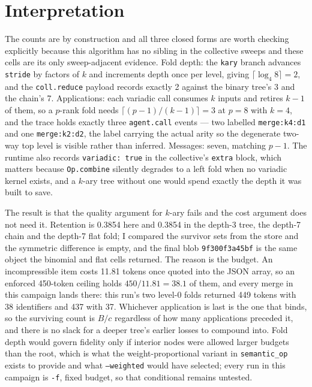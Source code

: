 \documentclass[11pt]{article}
\begin{document}
\section{Interpretation}

The counts are by construction and all three closed forms are worth checking explicitly
because this algorithm has no sibling in the collective sweeps and these cells are its only
sweep-adjacent evidence. Fold depth: the \texttt{kary} branch advances
\texttt{stride} by factors of $k$ and increments depth once per level, giving
$\lceil\log_4 8\rceil = 2$, and the \texttt{coll.reduce} payload records exactly 2 against
the binary tree's 3 and the chain's 7. Applications: each variadic call consumes $k$ inputs
and retires $k-1$ of them, so a $p$-rank fold needs $\lceil (p-1)/(k-1)\rceil = 3$ at $p=8$
with $k=4$, and the trace holds exactly three \texttt{agent.call} events --- two labelled
\texttt{merge:k4:d1} and one \texttt{merge:k2:d2}, the label carrying the actual arity so
the degenerate two-way top level is visible rather than inferred. Messages: seven, matching
$p-1$. The runtime also records \texttt{variadic: true} in the collective's \texttt{extra}
block, which matters because \texttt{Op.combine} silently degrades to a left fold when no
variadic kernel exists, and a $k$-ary tree without one would spend exactly the depth it was
built to save.

The result is that the quality argument for $k$-ary fails and the cost argument does not
need it. Retention is 0.3854 here and 0.3854 in the depth-3 tree, the depth-7 chain and the
depth-7 flat fold; I compared the survivor sets from the store and the symmetric difference
is empty, and the final blob \texttt{9f300f3a45bf} is the same object the binomial and flat
cells returned. The reason is the budget. An incompressible item costs 11.81 tokens once
quoted into the JSON array, so an enforced 450-token ceiling holds $450/11.81 = 38.1$ of
them, and every merge in this campaign lands there: this run's two level-0 folds returned
449 tokens with 38 identifiers and 437 with 37. Whichever application is last is the one
that binds, so the surviving count is $B/c$ regardless of how many applications preceded
it, and there is no slack for a deeper tree's earlier losses to compound into. Fold depth
would govern fidelity only if interior nodes were allowed larger budgets than the root,
which is what the weight-proportional variant in \texttt{semantic\_op} exists to provide
and what \texttt{--weighted} would have selected; every run in this campaign is
\texttt{-f}, fixed budget, so that conditional remains untested.
\end{document}
